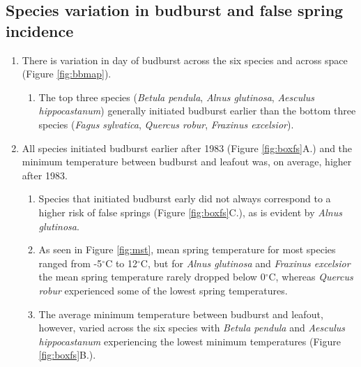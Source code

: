 \documentclass{article}\usepackage[]{graphicx}\usepackage[]{color}
\begin{document}
\subsection*{Species variation in budburst and false spring incidence}
\begin{enumerate}
\item There is variation in day of budburst across the six species and across space (Figure \ref{fig:bbmap}). 
\begin{enumerate}
\item The top three species (\textit{Betula pendula}, \textit{Alnus glutinosa}, \textit{Aesculus hippocastanum}) generally initiated budburst earlier than the bottom three species (\textit{Fagus sylvatica}, \textit{Quercus robur}, \textit{Fraxinus excelsior}).
\end{enumerate}

\item All species initiated budburst earlier after 1983 (Figure \ref{fig:boxfs}A.) and the minimum temperature between budburst and leafout was, on average, higher after 1983. 
\begin{enumerate}
\item Species that initiated budburst early did not always correspond to a higher risk of false springs (Figure \ref{fig:boxfs}C.), as is evident by \textit{Alnus glutinosa}.
\item As seen in Figure \ref{fig:mst}, mean spring temperature for most species ranged from -5$^{\circ}$C to 12$^{\circ}$C, but for \textit{Alnus glutinosa} and \textit{Fraxinus excelsior} the mean spring temperature rarely dropped below 0$^{\circ}$C, whereas \textit{Quercus robur} experienced some of the lowest spring temperatures.
\item The average minimum temperature between budburst and leafout, however, varied across the six species with \textit{Betula pendula} and \textit{Aesculus hippocastanum} experiencing the lowest minimum temperatures (Figure \ref{fig:boxfs}B.). 
\end{enumerate}
\end{enumerate}
\end{document}
